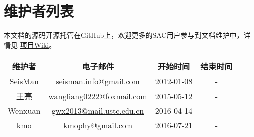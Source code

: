{\section*{维护者列表}}

本文档的源码开源托管在GitHub上，欢迎更多的SAC用户参与到文档维护中，详情见
\href{https://github.com/seisman/SAC_Docs_zh/wiki}{项目Wiki}。

\begin{table}[H]
\centering
\begin{tabular}{cccc}
\toprule
维护者      & 电子邮件              &   开始时间    &   结束时间     \\
\midrule
SeisMan  & \url{seisman.info@gmail.com}    &  2012-01-08   &   -     \\
王亮     & \url{wangliang0222@foxmail.com} &  2015-05-12   &   -     \\
Wenxuan  & \url{gwx2013@mail.ustc.edu.cn}  &  2016-04-14   &   -     \\
kmo      & \url{kmophy@gmail.com}          &  2016-07-21   &   -     \\
\bottomrule
\end{tabular}
\end{table}
